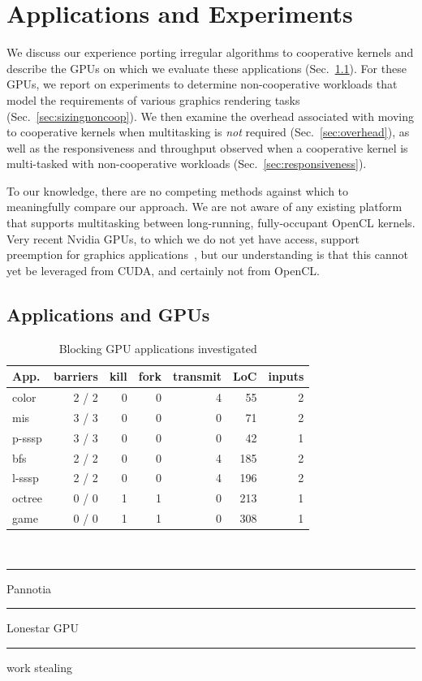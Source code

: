 \documentclass[parskip=half,sigconf,review, anonymous=true, acmcopyrightmode=none]{acmart}
\newcommand\crule[3][black]{\textcolor{#1}{\rule{#2}{#3}}}
\newcommand{\mysec}{Sec.~}
\newcommand{\nvidia}{Nvidia\xspace}
\begin{document}
\section{Applications and Experiments}\label{sec:experiments}

We discuss our experience porting irregular algorithms to cooperative
kernels and describe the GPUs on which we evaluate these applications
(\mysec\ref{sec:portingalgorithms}).  For these GPUs, we report on
experiments to determine non-cooperative workloads that model the
requirements of various graphics rendering tasks
(\mysec\ref{sec:sizingnoncoop}).  We then examine the overhead
associated with moving to cooperative kernels when multitasking is
\emph{not} required (\mysec\ref{sec:overhead}), as well as the
responsiveness and throughput observed when a cooperative kernel is
multi-tasked with non-cooperative workloads
(\mysec\ref{sec:responsiveness}).

To our knowledge, there are no competing methods against which to
meaningfully compare our approach.  We are not aware of any existing
platform that supports multitasking between long-running, fully-occupant
OpenCL kernels.  Very recent \nvidia{} GPUs, to which we do not yet have
access, support preemption for graphics
applications~\cite{PascalWhitepaper}, but our understanding is that this
cannot yet be leveraged from CUDA, and certainly not from OpenCL.


\subsection{Applications and GPUs}\label{sec:portingalgorithms}

\begin{table}[t]
\normalsize
\centering
\begin{tabular}{ l r r r r r r}
App. & barriers & kill & fork & transmit & LoC & inputs\\
\hline
\rowcolor{Gray1}
color & 2 / 2 & 0 & 0 & 4 & 55 & 2\\
\rowcolor{Gray1}
mis & 3 / 3 & 0 & 0 & 0 & 71 & 2\\
\rowcolor{Gray1}
p-sssp & 3 / 3 & 0 & 0 & 0  & 42 & 1\\
\rowcolor{Gray2}
bfs & 2 / 2 & 0 & 0  & 4  & 185 & 2\\
\rowcolor{Gray2}
l-sssp & 2 / 2 & 0 & 0  & 4  & 196 & 2\\
\rowcolor{Gray3}
octree & 0 / 0 & 1 & 1 & 0 & 213 & 1 \\
\rowcolor{Gray3}
game & 0 / 0 & 1 & 1 & 0 & 308 & 1 \\
\end{tabular} \\
\crule[Gray1]{.2cm}{.2cm} Pannotia \hspace{.4cm} \crule[Gray2]{.2cm}{.2cm} Lonestar GPU  \hspace{.4cm}  \crule[Gray3]{.2cm}{.2cm} work stealing
\caption{Blocking GPU applications investigated}
\label{tab:applications}
\vspace{-8mm}
\end{table}
\end{document}
